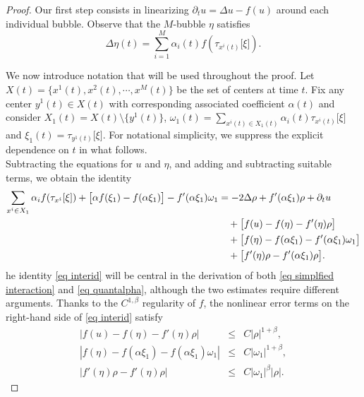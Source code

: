 \documentclass[11pt,letterpaper,reqno]{amsart}
\theoremstyle{plain}%
\theoremstyle{definition}
\numberwithin{equation}{section}
\numberwithin{figure}{section}
\begin{document}
\begin{proof}
\medskip 

 Our first step consists in linearizing $\partial_t u = \Delta u-f(u)$ around each individual bubble. Observe that the $M$-bubble $\eta$ satisfies
\begin{equation*}\label{eq xi}
	\Delta \eta(t) = \sum_{i=1}^M \alpha_i(t)f(\tau_{x^i(t)}\big[\xi\big]).
\end{equation*}

We now introduce notation that will be used throughout the proof. Let $ X(t)= \{x^1(t), x^2(t),\cdots, x^M(t)\}$ be the set of centers at time $t$. Fix any center $y^1(t) \in X(t)$ with corresponding associated coefficient $\alpha(t)$ and consider $X_1(t) = X(t)\setminus\{y^1(t)\}$,  $\omega_{1}(t)= \sum_{x^i(t) \in X_1(t)} \alpha_i(t)\tau_{x^i(t)}\big[\xi\big]$ and $\xi_1(t) = \tau_{y^1(t)}\big[\xi\big]$. For notational simplicity, we suppress the explicit dependence on $t$ in what follows.\\

Subtracting the equations for $u$ and $\eta$, and adding and subtracting suitable terms, we obtain the identity
\begin{align}
\sum_{x^i \in X_1} \alpha_i f(\tau_{x^i}[\xi])
+ \big[\alpha f(\xi_1) - f(\alpha \xi_1)\big]
- f'(\alpha \xi_1)\omega_1
&=
-2\Delta \rho
+ f'(\alpha \xi_1)\rho
+ \partial_t u
\notag \\
&\quad
+ \big[f(u)-f(\eta)-f'(\eta)\rho\big]
\notag \\
&\quad
+ \big[f(\eta)-f(\alpha\xi_1)-f'(\alpha\xi_1)\omega_1\big]
\notag \\
&\quad
+ \big[f'(\eta)\rho - f'(\alpha\xi_1)\rho\big].
\label{eq interid}
\end{align}
he identity \eqref{eq interid} will be central in the derivation of both \eqref{eq simplfied interaction} and \eqref{eq quantalpha}, although the two estimates require different arguments. Thanks to the $C^{1,\beta}$ regularity of $f$, the nonlinear error terms on the right-hand side of \eqref{eq interid} satisfy
\begin{eqnarray}\label{eq aux1}
	|f(u)-f(\eta)-f'(\eta)\rho|&\leq& C|\rho|^{1+\beta},\\\label{eq aux2}
|f(\eta)-f(\alpha\xi_1)-f( \alpha\xi_1)\omega_{1}|&\leq& C|\omega_{1}|^{1+\beta},\\\label{eq aux3}
	|f'(\eta)\rho-f'( \eta)\rho|&\leq& C|\omega_{1}|^{\beta}|\rho|.
\end{eqnarray}


\end{proof}
\end{document}
